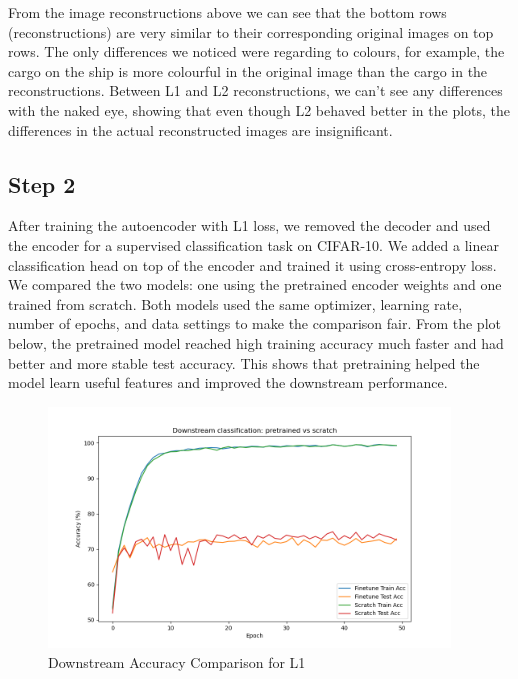 From the image reconstructions above we can see that the bottom rows (reconstructions) are very similar to their corresponding original images on top rows. The only differences we noticed were regarding to colours, for example, the cargo on the ship is more colourful in the original image than the cargo in the reconstructions. Between L1 and L2 reconstructions, we can't see any differences with the naked eye, showing that even though L2 behaved better in the plots, the differences in the actual reconstructed images are insignificant.

\subsection{Step 2}

After training the autoencoder with L1 loss, we removed the decoder and used the encoder for a supervised classification task on CIFAR-10. We added a linear classification head on top of the encoder and trained it using cross-entropy loss. We compared the two models: one using the pretrained encoder weights and one trained from scratch. Both models used the same optimizer, learning rate, number of epochs, and data settings to make the comparison fair. From the plot below, the pretrained model reached high training accuracy much faster and had better and more stable test accuracy. This shows that pretraining helped the model learn useful features and improved the downstream performance.

\begin{figure}[H] 
    \centering
    \includegraphics[width=0.95\textwidth]{assignment_2/report/images/ex1_downstream_accuracy_comparison.png} 
    \caption{Downstream Accuracy Comparison for L1}
\end{figure}





